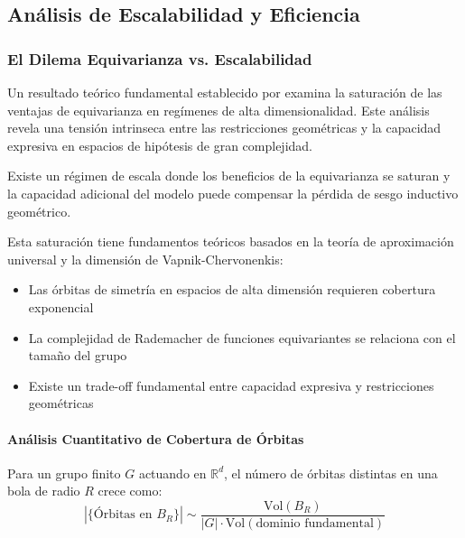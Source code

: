 \subsection{Análisis de Escalabilidad y Eficiencia}

\subsubsection{El Dilema Equivarianza vs. Escalabilidad}\label{subsubsec:dilema_equivarianza_escalabilidad}

Un resultado teórico fundamental establecido por \citet{park2024equivariancescale} examina la saturación de las ventajas de equivarianza en regímenes de alta dimensionalidad. Este análisis revela una tensión intrinseca entre las restricciones geométricas y la capacidad expresiva en espacios de hipótesis de gran complejidad.

\begin{hypothesis}
Existe un régimen de escala donde los beneficios de la equivarianza se saturan y la capacidad adicional del modelo puede compensar la pérdida de sesgo inductivo geométrico.
\end{hypothesis}

Esta saturación tiene fundamentos teóricos basados en la teoría de aproximación universal y la dimensión de Vapnik-Chervonenkis:

\begin{itemize}
\item Las órbitas de simetría en espacios de alta dimensión requieren cobertura exponencial
\item La complejidad de Rademacher de funciones equivariantes se relaciona con el tamaño del grupo
\item Existe un trade-off fundamental entre capacidad expresiva y restricciones geométricas
\end{itemize}

\paragraph{Análisis Cuantitativo de Cobertura de Órbitas}

Para un grupo finito $G$ actuando en $\mathbb{R}^d$, el número de órbitas distintas en una bola de radio $R$ crece como:
\begin{equation}
|\{\text{Órbitas en } B_R\}| \sim \frac{\text{Vol}(B_R)}{|G| \cdot \text{Vol}(\text{dominio fundamental})}
\end{equation}

